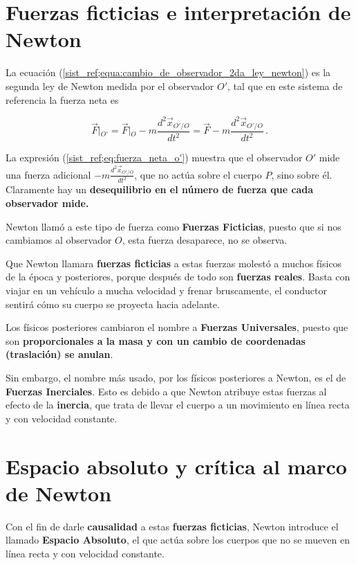 \documentclass[../apunte_mecanica_clasica.tex]{subfiles}%
\begin{document}
\section{Fuerzas ficticias e interpretación de Newton}

La ecuación (\ref{sist_ref;equa:cambio_de_observador_2da_ley_newton}) es la segunda ley de Newton medida por el observador $O'$, tal que en este sistema de referencia la fuerza neta es

\begin{equation}\label{sist_ref;eq:fuerza_neta_o'}
    \vec{F}\left|_{O'}\right. = \vec{F}\left|_{O}\right. - m\frac{d^2\vec{x}_{O'/O}}{dt^2} = \vec{F} - m\frac{d^2\vec{x}_{O'/O}}{dt^2} \,.
\end{equation}

La expresión (\ref{sist_ref;eq:fuerza_neta_o'}) muestra que el observador $O'$ mide una fuerza adicional $-m\frac{d^2\vec{x}_{O'/O}}{dt^2}$, que no actúa sobre el cuerpo $P$, sino sobre él. Claramente hay un \textbf{desequilibrio en el número de fuerza que cada observador mide.}

Newton llamó a este tipo de fuerza como \textbf{Fuerzas Ficticias}, puesto que si nos cambiamos al observador $O$, esta fuerza desaparece, no se observa.

Que Newton llamara \textbf{fuerzas ficticias} a estas fuerzas molestó a muchos físicos de la época y posteriores, porque después de todo son \textbf{fuerzas reales}. Basta con viajar en un vehículo a mucha velocidad y frenar bruscamente, el conductor sentirá cómo su cuerpo se proyecta hacia adelante.

Los físicos posteriores cambiaron el nombre a \textbf{Fuerzas Universales}, puesto que son \textbf{proporcionales a la masa y con un cambio de coordenadas (traslación) se anulan}.

Sin embargo, el nombre más usado, por los físicos posteriores a Newton, es el de \textbf{Fuerzas Inerciales}. Esto es debido a que Newton atribuye estas fuerzas al efecto de la \textbf{inercia}, que trata de llevar el cuerpo a un movimiento en línea recta y con velocidad constante.

\section{Espacio absoluto y crítica al marco de Newton}

Con el fin de darle \textbf{causalidad} a estas \textbf{fuerzas ficticias}, Newton introduce el llamado \textbf{Espacio Absoluto}, el que actúa sobre los cuerpos que no se mueven en línea recta y con velocidad constante.
\end{document}
